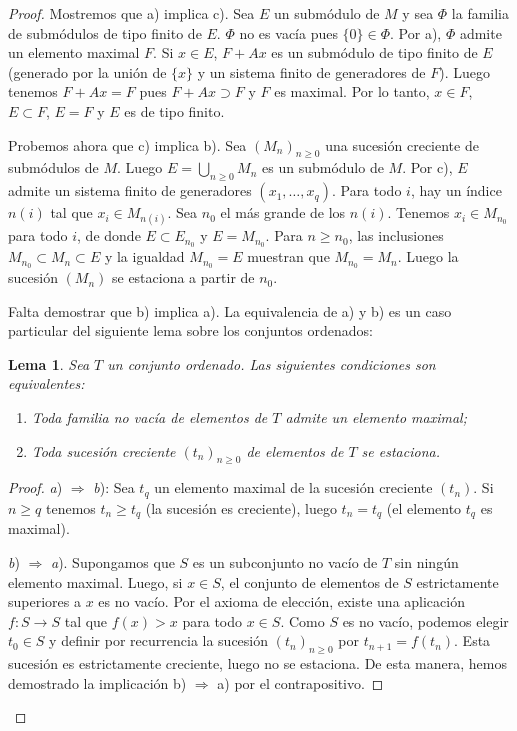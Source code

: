 \documentclass[10pt,oneside,bibtotoc,smallheadings,leqno,a5paper,DIV=12]{scrbook}
\newcommand{\QED}{}%
\newcommand{\then}{\ensuremath{\Rightarrow}\xspace}
\renewcommand{\to}[1][]{\xrightarrow{#1}}
\numberwithin{equation}{section}
\theoremstyle{defi}
\theoremstyle{enonce}
\newtheorem{lemma}{Lema}
\theoremstyle{rem}
\numberwithin{theorem}{section}
\numberwithin{proposition}{section}
\numberwithin{definition}{section}
\numberwithin{lemma}{section}
\numberwithin{corollary}{section}
\numberwithin{example}{section}
\numberwithin{footnote}{section}%
\begin{document}
\begin{proof}
Mostremos que a) implica c). Sea $E$ un subm\'odulo de $M$ y
sea $\Phi$ la familia de subm\'odulos de tipo finito de $E$.
$\Phi$ no es vac\'ia pues $\{0\}\in\Phi$. Por a), $\Phi$ admite
un elemento maximal $F$. Si $x\in E$, $F+Ax$ es un subm\'odulo
de tipo finito de $E$ (generado por la uni\'on de $\{x\}$ y
un sistema finito de generadores de $F$). Luego tenemos
$F+Ax = F$ pues $F+Ax\supset F$ y $F$ es maximal. Por lo tanto,
$x\in F$, $E\subset F$, $E = F$ y $E$ es de tipo finito.

Probemos ahora que c) implica b). Sea $(M_{n})_{n\geq 0}$
una sucesi\'on creciente de subm\'odulos de $M$. Luego
$E = \bigcup_{n\geq 0}M_{n}$ es un subm\'odulo de $M$.
Por c), $E$ admite un sistema finito de generadores
$(x_{1},\dots,x_{q})$. Para todo $i$, hay un \'indice
$n(i)$ tal que $x_{i}\in M_{n(i)}$. Sea $n_{0}$ el m\'as
grande de los $n(i)$. Tenemos $x_{i}\in M_{n_{0}}$ para todo
$i$, de donde $E\subset E_{n_{0}}$ y $E = M_{n_{0}}$. Para
$n\geq n_{0}$, las inclusiones $M_{n_{0}}\subset M_{n}
\subset E$ y la igualdad $M_{n_{0}} = E$ muestran que
$M_{n_{0}} = M_{n}$. Luego la sucesi\'on $(M_{n})$ se
estaciona a partir de $n_{0}$.

Falta demostrar que b) implica a). La equivalencia
de a) y b) es un caso particular del siguiente lema sobre
los conjuntos ordenados:

\begin{lemma}
Sea $T$ un conjunto ordenado. Las siguientes condiciones son
equivalentes:
\begin{enumerate}
\item[a)] Toda familia no vac\'ia de elementos de $T$ admite un
elemento maximal;
\item[b)] Toda sucesi\'on creciente $(t_{n})_{n\geq 0}$ de
elementos de $T$ se estaciona.
\end{enumerate}
\end{lemma}

\begin{proof}
{\itshape a}) \then{ \itshape b}): Sea $t_{q}$ un elemento maximal de la sucesi\'on
creciente $(t_{n})$. Si $n\geq q$ tenemos $t_{n}\geq t_{q}$
(la sucesi\'on es creciente), luego $t_{n} = t_{q}$ (el elemento
$t_{q}$ es maximal).

{\itshape b}) \then{ \itshape a}). Supongamos que $S$ es un subconjunto no vac\'io
de $T$ sin ning\'un elemento maximal. Luego, si $x\in S$, el conjunto
de elementos de $S$ estrictamente superiores a $x$ es no
vac\'io. Por el axioma de elecci\'on, existe una aplicaci\'on
$f:S\to S$ tal que $f(x) > x$ para todo $x\in S$. Como $S$ es
no vac\'io, podemos elegir $t_{0}\in S$ y definir por recurrencia
la sucesi\'on $(t_{n})_{n\geq 0}$ por $t_{n+1}=f(t_{n})$.
Esta sucesi\'on es estrictamente creciente, luego no se estaciona.
De esta manera, hemos demostrado la implicaci\'on b) \then a)
por el contrapositivo. \QED
\end{proof}
\end{proof}
\end{document}
